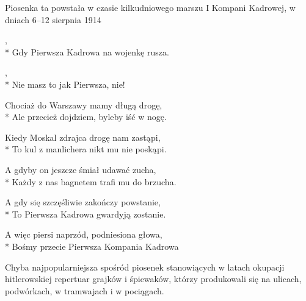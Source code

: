 \begin{info}Piosenka ta powstała w czasie kilkudniowego marszu I Kompani Kadrowej, w dniach 6–12 sierpnia 1914\end{info}

\begin{lyrics}[longestline={Ale przecież dojdziem, byleby iść w nogę.}]

,\\*
Gdy Pierwsza Kadrowa na wojenkę rusza.

\begin{chorus}
,\\*
Nie masz to jak Pierwsza, nie!
\end{chorus}

Chociaż do Warszawy mamy długą drogę,\\*
Ale przecież dojdziem, byleby iść w nogę.

\chorusref

Kiedy Moskal zdrajca drogę nam zastąpi,\\*
To kul z manlichera nikt mu nie poskąpi.

\chorusref

A gdyby on jeszcze śmiał udawać zucha,\\*
Każdy z nas bagnetem trafi mu do brzucha.

\chorusref

A gdy się szczęśliwie zakończy powstanie,\\*
To Pierwsza Kadrowa gwardyją zostanie.

\chorusref

A więc piersi naprzód, podniesiona głowa,\\*
Bośmy przecie Pierwsza Kompania Kadrowa

\chorusref
\end{lyrics}



\begin{info}Chyba najpopularniejsza spośród piosenek stanowiących w latach okupacji hitlerowskiej repertuar grajków i śpiewaków, którzy produkowali się na ulicach, podwórkach, w tramwajach i w pociągach. \end{info}

